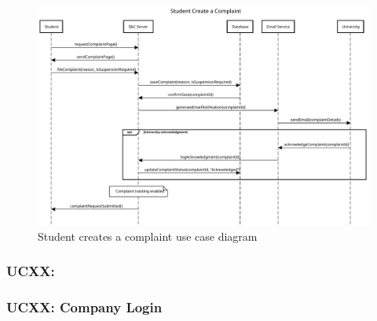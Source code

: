 \begin{figure}[H]
    \centering
    \includegraphics[width=1.0\textwidth]{Images/UC_6.pdf}
    \caption{Student creates a complaint use case diagram}
    \label{fig:use-case-diagram-6}
\end{figure}


\subsubsection{UCXX: }
\label{subsubsec:UC_07_TO_MODIFY}


\subsubsection{UCXX: Company Login}
\label{subsubsec:company-login}

